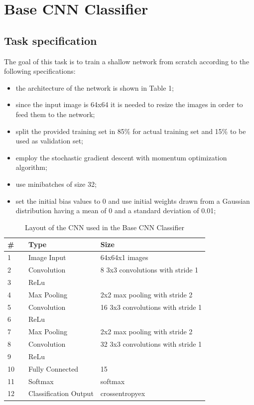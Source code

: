\documentclass[12pt, a4paper, italian]{scrartcl}
\begin{document}
  \newpage
  \section{Base CNN Classifier}
  \subsection{Task specification}
  The goal of this task is to train a shallow network from scratch according to the following specifications:
\begin{itemize}
	\item the architecture of the network is shown in Table 1;
	\item since the input image is 64x64 it is needed to resize the images in order to feed them to the network;
	\item split the provided training set in 85\% for actual training set and 15\% to be used as validation set;
	\item employ the stochastic gradient descent with momentum optimization algorithm;
	\item use minibatches of size 32;
	\item set the initial bias values to 0 and use initial weights drawn from a Gaussian distribution having a mean of 0 and a standard deviation of 0.01;
\end{itemize}

\begin{table}[h]
\centering
\begin{tabular}{llll}
\hline
 \#&  &Type &Size  \\
 \hline
 1& & Image Input &64x64x1 images  \\
 2&  & Convolution   & 8 3x3 convolutions with stride 1 \\
 3&  & ReLu   & \\
 4&  & Max Pooling   &2x2 max pooling with stride 2 \\
 5&  & Convolution   &16 3x3 convolutions with stride 1 \\
 6&  & ReLu   & \\
 7&  & Max Pooling   &2x2 max pooling with stride 2 \\
 8&  & Convolution   &32 3x3 convolutions with stride 1 \\
 9&  & ReLu   & \\
 10&  & Fully Connected   &15 \\
 11&  & Softmax   &softmax \\
 12&  & Classification Output   &crossentropyex \\
 
\end{tabular}
\caption{Layout of the CNN used in the Base CNN Classifier }
\end{table}
\end{document}
